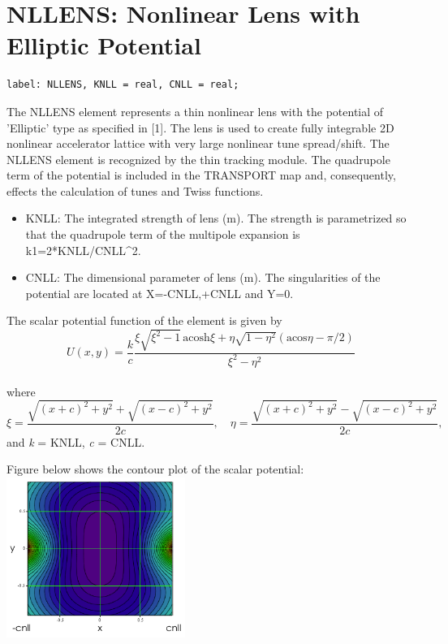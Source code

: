
\section{NLLENS: Nonlinear Lens with Elliptic Potential}

\begin{verbatim}
label: NLLENS, KNLL = real, CNLL = real;
\end{verbatim}

The NLLENS element represents a thin nonlinear lens with the potential
of 'Elliptic' type as specified in [1]. The lens is used to create fully
integrable 2D nonlinear accelerator lattice with very large nonlinear
tune spread/shift. The NLLENS element is recognized by the thin tracking
module. The quadrupole term of the potential is included in the
TRANSPORT map and, consequently, effects the calculation of tunes and
Twiss functions.   

\begin{itemize}
   \item KNLL: The integrated strength of lens (m). The strength is
     parametrized so that     the quadrupole term of the multipole
     expansion is k1=2*KNLL/CNLL\textasciicircum2.      
   \item CNLL: The dimensional parameter of lens (m). The singularities
     of the potential are     located at X=-CNLL,+CNLL and Y=0.  
\end{itemize}

The scalar potential function of the element is given by
\\
\[
U(x,y)=\frac{k}{c}\frac{\xi\sqrt{\xi^2-1} \, \text{acosh}\xi + \eta\sqrt{1-\eta^2}(\text{acos}\eta-\pi/2)}{\xi^2-\eta^2}
\]
\\ where 
\[
\xi = \frac{\sqrt{(x+c)^2+y^2}+\sqrt{(x-c)^2+y^2}}{2c}, \quad \eta = \frac{\sqrt{(x+c)^2+y^2}-\sqrt{(x-c)^2+y^2}}{2c},
\]
and \textit{k} = KNLL, \textit{c} = CNLL.

Figure below shows the contour plot of the scalar potential: \\
\includegraphics[width=220px]{Introduction/nllens_potential-2D.png}

